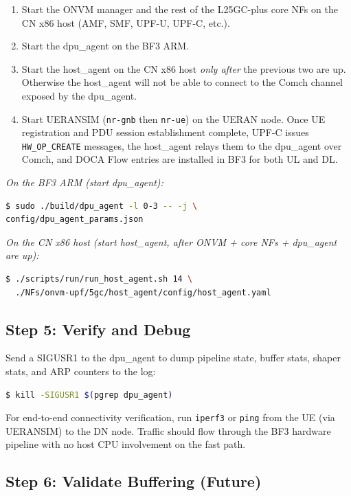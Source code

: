 \documentclass[conference]{IEEEtran}
\newcommand{\code}[1]{\nolinkurl{#1}}
\newcommand{\runlabel}[1]{\medskip\noindent\textit{#1}\par}
\begin{document}
\begin{enumerate}
  \item Start the ONVM manager and the rest of the L25GC-plus core NFs
        on the CN x86 host (AMF, SMF, UPF-U, UPF-C, etc.).
  \item Start the dpu\_agent on the BF3 ARM.
  \item Start the host\_agent on the CN x86 host \emph{only after} the
        previous two are up.  Otherwise the host\_agent will not be
        able to connect to the Comch channel exposed by the dpu\_agent.
  \item Start UERANSIM (\code{nr-gnb} then \code{nr-ue}) on the UERAN
        node.  Once UE registration and PDU session establishment
        complete, UPF-C issues \code{HW_OP_CREATE} messages, the
        host\_agent relays them to the dpu\_agent over Comch, and DOCA
        Flow entries are installed in BF3 for both UL and DL.
\end{enumerate}

\runlabel{On the BF3 ARM (start dpu\_agent):}
\begin{lstlisting}[language=bash]
$ sudo ./build/dpu_agent -l 0-3 -- -j \
config/dpu_agent_params.json
\end{lstlisting}

\runlabel{On the CN x86 host (start host\_agent, after ONVM + core NFs + dpu\_agent are up):}
\begin{lstlisting}[language=bash]
$ ./scripts/run/run_host_agent.sh 14 \
  ./NFs/onvm-upf/5gc/host_agent/config/host_agent.yaml
\end{lstlisting}

\subsection{Step 5: Verify and Debug}

Send a SIGUSR1 to the dpu\_agent to dump pipeline state, buffer stats,
shaper stats, and ARP counters to the log:
\begin{lstlisting}[language=bash]
$ kill -SIGUSR1 $(pgrep dpu_agent)
\end{lstlisting}

For end-to-end connectivity verification, run \texttt{iperf3} or
\texttt{ping} from the UE (via UERANSIM) to the DN node.  Traffic should
flow through the BF3 hardware pipeline with no host CPU involvement on the
fast path.

\subsection{Step 6: Validate Buffering (Future)}
\end{document}
